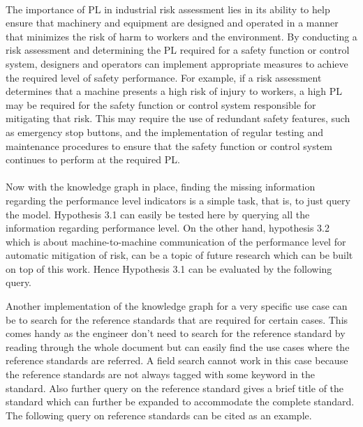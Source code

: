 \paragraph{} The importance of PL in industrial risk assessment lies in its ability to help ensure that machinery and equipment are designed and operated in a manner that minimizes the risk of harm to workers and the environment. By conducting a risk assessment and determining the PL required for a safety function or control system, designers and operators can implement appropriate measures to achieve the required level of safety performance. For example, if a risk assessment determines that a machine presents a high risk of injury to workers, a high PL may be required for the safety function or control system responsible for mitigating that risk. This may require the use of redundant safety features, such as emergency stop buttons, and the implementation of regular testing and maintenance procedures to ensure that the safety function or control system continues to perform at the required PL. 

\paragraph{} Now with the knowledge graph in place, finding the missing information regarding the performance level indicators is a simple task, that is, to just query the model. Hypothesis 3.1 can easily be tested here by querying all the information regarding performance level. On the other hand, hypothesis 3.2 which is about machine-to-machine communication of the performance level for automatic mitigation of risk, can be a topic of future research which can be built on top of this work. Hence Hypothesis 3.1 can be evaluated by the following query.


\bigskip\bigskip {}

Another implementation of the knowledge graph for a very specific use case can be to search for the reference standards that are required for certain cases. This comes handy as the engineer don't need to search for the reference standard by reading through the whole document but can easily find the use cases where the reference standards are referred. A field search cannot work in this case because the reference standards are not always tagged with some keyword in the standard. Also further query on the reference standard gives a brief title of the standard which can further be expanded to accommodate the complete standard. The following query on reference standards can be cited as an example.

